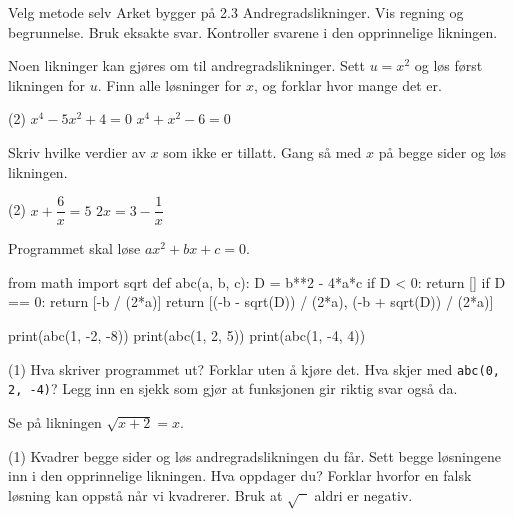 
\begin{infoboks}{Velg metode selv}
Arket bygger på 2.3 Andregradslikninger. Vis regning og begrunnelse. Bruk eksakte svar.
Kontroller svarene i den opprinnelige likningen.
\end{infoboks}


Noen likninger kan gjøres om til andregradslikninger. Sett $u = x^2$ og løs først likningen for $u$. Finn alle løsninger for $x$, og forklar hvor mange det er.
\begin{tasks}(2)
  \task $x^4 - 5x^2 + 4 = 0$
  \task $x^4 + x^2 - 6 = 0$
\end{tasks}

Skriv hvilke verdier av $x$ som ikke er tillatt. Gang så med $x$ på begge sider og løs likningen.
\begin{tasks}(2)
  \task $x + \dfrac{6}{x} = 5$
  \task $2x = 3 - \dfrac{1}{x}$
\end{tasks}

Programmet skal løse $ax^2 + bx + c = 0$.
\begin{kode}
from math import sqrt
def abc(a, b, c):
    D = b**2 - 4*a*c
    if D < 0:
        return []
    if D == 0:
        return [-b / (2*a)]
    return [(-b - sqrt(D)) / (2*a), (-b + sqrt(D)) / (2*a)]

print(abc(1, -2, -8))
print(abc(1, 2, 5))
print(abc(1, -4, 4))
\end{kode}
\begin{tasks}(1)
  \task Hva skriver programmet ut? Forklar uten å kjøre det.
  \task Hva skjer med \lstinline[style=laereverk,numbers=none,frame=none]|abc(0, 2, -4)|? Legg inn en sjekk som gjør at funksjonen gir riktig svar også da.
\end{tasks}


Se på likningen $\sqrt{x + 2} = x$.
\begin{tasks}(1)
  \task Kvadrer begge sider og løs andregradslikningen du får.
  \task Sett begge løsningene inn i den opprinnelige likningen. Hva oppdager du?
  \task Forklar hvorfor en falsk løsning kan oppstå når vi kvadrerer. Bruk at $\sqrt{\phantom{x}}$ aldri er negativ.
\end{tasks}

